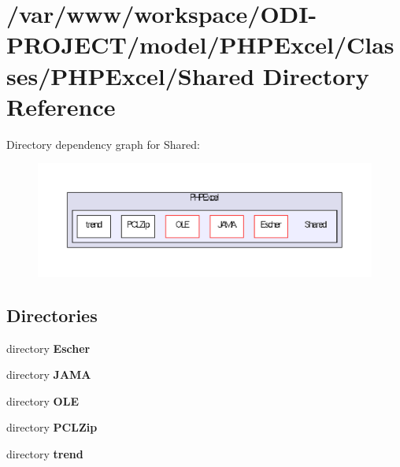 \section{/var/www/workspace/\+O\+D\+I-\/\+P\+R\+O\+J\+E\+C\+T/model/\+P\+H\+P\+Excel/\+Classes/\+P\+H\+P\+Excel/\+Shared Directory Reference}
\label{dir_8d7d5a1928cec93f867472a2e0074013}
Directory dependency graph for Shared\+:\nopagebreak
\begin{figure}[H]
\begin{center}
\leavevmode
\includegraphics[width=350pt]{dir_8d7d5a1928cec93f867472a2e0074013_dep}
\end{center}
\end{figure}
\subsection*{Directories}
\begin{DoxyCompactItemize}
\item 
directory {\bf Escher}
\item 
directory {\bf J\+A\+M\+A}
\item 
directory {\bf O\+L\+E}
\item 
directory {\bf P\+C\+L\+Zip}
\item 
directory {\bf trend}
\end{DoxyCompactItemize}
